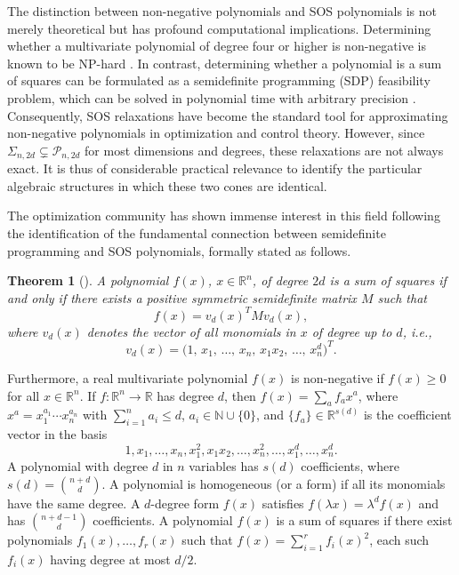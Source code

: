 \documentclass[12pt]{elsarticle}
\newtheorem{theorem}{Theorem}[section]
\theoremstyle{definition}
\begin{document}
The distinction between non-negative polynomials and SOS polynomials is not merely theoretical but has profound computational implications. Determining whether a multivariate polynomial of degree four or higher is non-negative is known to be NP-hard \cite{murty1987some}. In contrast, determining whether a polynomial is a sum of squares can be formulated as a semidefinite programming (SDP) feasibility problem, which can be solved in polynomial time with arbitrary precision \cite{vandenberghe1996semidefinite}. Consequently, SOS relaxations have become the standard tool for approximating non-negative polynomials in optimization and control theory. However, since $\Sigma_{n,2d} \subsetneq \mathcal{P}_{n,2d}$ for most dimensions and degrees, these relaxations are not always exact. It is thus of considerable practical relevance to identify the particular algebraic structures in which these two cones are identical.

The optimization community has shown immense interest in this field following the identification of the fundamental connection between semidefinite programming and SOS polynomials, formally stated as follows.

\begin{theorem}[\citealp{choi1995sums, parrilo2000structured}]\label{thm:sos-gram}
A polynomial $f(x)$, $x \in \mathbb{R}^n$, of degree $2d$ is a sum of squares if and only if there exists a positive symmetric semidefinite matrix $M$ such that
\[
f(x) = v_d(x)^{T} M v_d(x),
\]
where $v_d(x)$ denotes the vector of all monomials in $x$ of degree up to $d$, i.e.,
\[
v_d(x) = \big(1,\, x_{1},\, \ldots,\, x_{n},\, x_{1}x_{2},\, \ldots,\, x_{n}^{d}\big)^{T}.
\]
\end{theorem}

Furthermore, a real multivariate polynomial $f(x)$ is non-negative if $f(x)\ge 0$ for all $x\in\mathbb{R}^n$. If $f:\mathbb{R}^n\to\mathbb{R}$ has degree $d$, then $f(x)=\sum_a f_a x^a$, where $x^a = x_1^{a_1}\cdots x_n^{a_n}$ with $\sum_{i=1}^n a_i\le d$, $a_i\in\mathbb{N}\cup\{0\}$, and $\{f_a\}\in\mathbb{R}^{s(d)}$ is the coefficient vector in the basis
\[
1,x_1,\dots,x_n,x_1^2,x_1x_2,\dots,x_n^2,\dots,x_1^d,\dots,x_n^d.
\]
A polynomial with degree $d$ in $n$ variables has $s(d)$ coefficients, where $s(d)=\binom{n+d}{d}$. A polynomial is homogeneous (or a form) if all its monomials have the same degree. A $d$-degree form $f(x)$ satisfies $f(\lambda x)=\lambda^d f(x)$ and has $\binom{n+d-1}{d}$ coefficients. A polynomial $f(x)$ is a sum of squares if there exist polynomials $f_1(x),\dots,f_r(x)$ such that $f(x)=\sum_{i=1}^r f_i(x)^2$, each such $f_i(x)$ having degree at most $d/2$.
\end{document}
